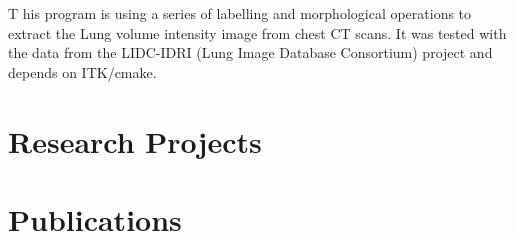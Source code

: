 \documentclass[11pt,fleqn]{book} %
\begin{document}
\begin{multicols}{3}
    [
        \subtitle{Understanding lung anatomy}
    ]
    \noindent \lettrine[lines=4]{\color{Black}T}{} his program is using a series of labelling and morphological operations to extract the Lung volume intensity image from chest CT scans. It was tested with the data 
    from the LIDC-IDRI (Lung Image Database Consortium) project and depends on ITK/cmake.
    
        
\end{multicols}




\chapter{Research Projects}
\newpage



\chapter{Publications}

\end{document}
